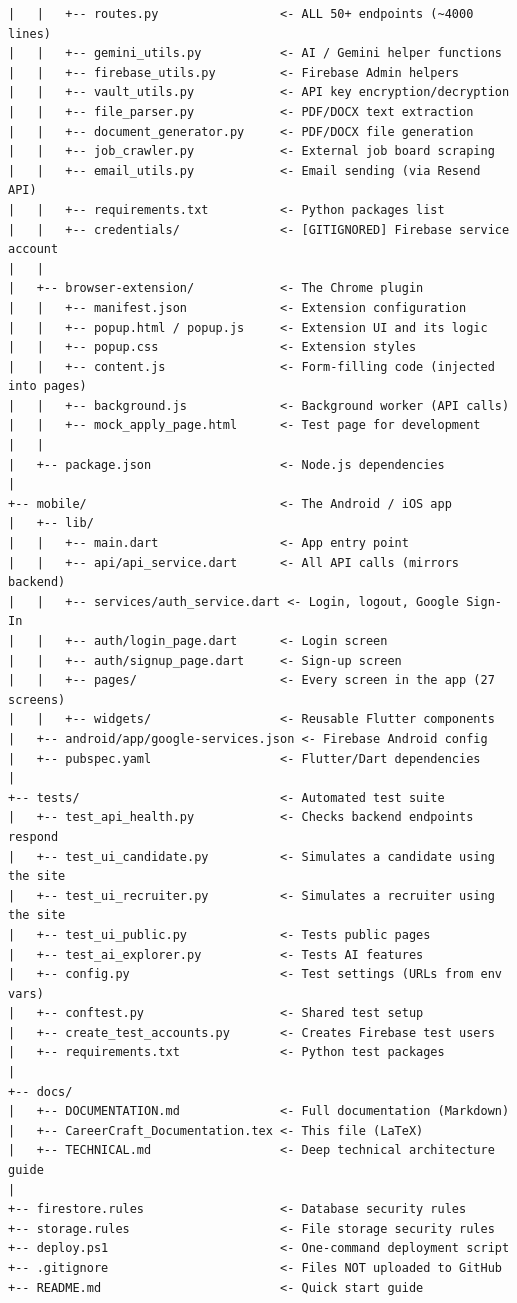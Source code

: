 \documentclass[12pt, a4paper]{report}
\begin{document}
\begin{lstlisting}[style=asciistyle, caption={Complete project folder structure}]
|   |   +-- routes.py                 <- ALL 50+ endpoints (~4000 lines)
|   |   +-- gemini_utils.py           <- AI / Gemini helper functions
|   |   +-- firebase_utils.py         <- Firebase Admin helpers
|   |   +-- vault_utils.py            <- API key encryption/decryption
|   |   +-- file_parser.py            <- PDF/DOCX text extraction
|   |   +-- document_generator.py     <- PDF/DOCX file generation
|   |   +-- job_crawler.py            <- External job board scraping
|   |   +-- email_utils.py            <- Email sending (via Resend API)
|   |   +-- requirements.txt          <- Python packages list
|   |   +-- credentials/              <- [GITIGNORED] Firebase service account
|   |
|   +-- browser-extension/            <- The Chrome plugin
|   |   +-- manifest.json             <- Extension configuration
|   |   +-- popup.html / popup.js     <- Extension UI and its logic
|   |   +-- popup.css                 <- Extension styles
|   |   +-- content.js                <- Form-filling code (injected into pages)
|   |   +-- background.js             <- Background worker (API calls)
|   |   +-- mock_apply_page.html      <- Test page for development
|   |
|   +-- package.json                  <- Node.js dependencies
|
+-- mobile/                           <- The Android / iOS app
|   +-- lib/
|   |   +-- main.dart                 <- App entry point
|   |   +-- api/api_service.dart      <- All API calls (mirrors backend)
|   |   +-- services/auth_service.dart <- Login, logout, Google Sign-In
|   |   +-- auth/login_page.dart      <- Login screen
|   |   +-- auth/signup_page.dart     <- Sign-up screen
|   |   +-- pages/                    <- Every screen in the app (27 screens)
|   |   +-- widgets/                  <- Reusable Flutter components
|   +-- android/app/google-services.json <- Firebase Android config
|   +-- pubspec.yaml                  <- Flutter/Dart dependencies
|
+-- tests/                            <- Automated test suite
|   +-- test_api_health.py            <- Checks backend endpoints respond
|   +-- test_ui_candidate.py          <- Simulates a candidate using the site
|   +-- test_ui_recruiter.py          <- Simulates a recruiter using the site
|   +-- test_ui_public.py             <- Tests public pages
|   +-- test_ai_explorer.py           <- Tests AI features
|   +-- config.py                     <- Test settings (URLs from env vars)
|   +-- conftest.py                   <- Shared test setup
|   +-- create_test_accounts.py       <- Creates Firebase test users
|   +-- requirements.txt              <- Python test packages
|
+-- docs/
|   +-- DOCUMENTATION.md              <- Full documentation (Markdown)
|   +-- CareerCraft_Documentation.tex <- This file (LaTeX)
|   +-- TECHNICAL.md                  <- Deep technical architecture guide
|
+-- firestore.rules                   <- Database security rules
+-- storage.rules                     <- File storage security rules
+-- deploy.ps1                        <- One-command deployment script
+-- .gitignore                        <- Files NOT uploaded to GitHub
+-- README.md                         <- Quick start guide
\end{lstlisting}
\end{document}
